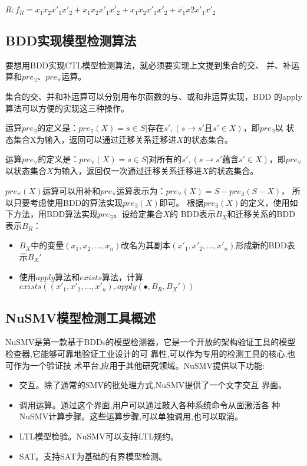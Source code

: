 $R:f_R=\overline{x_1x_2x'_1x'_2}+\overline{x_1x_2}x'_1\bar{x'_2}+x_1\overline{x_2x'_1}x'_2+\bar{x_1}x2\overline{x'_1x'_2}$
\subsection{BDD实现模型检测算法}

要想用BDD实现CTL模型检测算法，就必须要实现上文提到集合的交、
并、补运算和$pre_\exists$、$pre_\forall$运算。

集合的交、并和补运算可以分别用布尔函数的与、或和非运算实现，BDD
的apply算法可以方便的实现这三种操作。

运算$pre_\exists$的定义是：$pre_\exists(X)={s\in S|存在s',(s\to s'且s'\in X)}$，即$pre_\exists$以
状态集合X为输入，返回可以通过迁移关系迁移进$X$的状态集合。

运算$pre_\forall$的定义是：$pre_\forall(X)={s\in S|对所有的s',(s\to s'蕴含s'\in X)}$，即$pre_\forall$
以状态集合$X$为输入，返回仅一次通过迁移关系迁移进$X$的状态集合。

$pre_\forall (X)$运算可以用补和$pre_\forall$运算表示为：$pre_\forall (X)=S - pre_\exists(S-X)$，
所以只要考虑使用BDD的算法实现$pre_\exists(X)$即可。
根据$pre_\exists(X)$的定义，使用如下方法，用BDD算法实现$pre_\exists$。设给定集合$X$的
BDD表示$B_X$和迁移关系的BDD表示$B_R$：
\begin{itemize}

	\item $B_X$中的变量$(x_1,x_2,\ldots,x_n)$改名为其副本$(x'_1,x'_2,\ldots,x'_n)$形成新的BDD表示$B_X'$

	\item 使用$apply$算法和$exists$算法，计算$exists((x'_1,x'_2,\ldots,x'_n),apply(\bullet,B_R,B_X'))$

\end{itemize}


\subsection{NuSMV模型检测工具概述}


NuSMV是第一款基于BDDs的模型检测器，它是一个开放的架构验证工具的模型检查器,它能够可靠地验证工业设计的可
靠性,可以作为专用的检测工具的核心,也可作为一个验证技
术平台,应用于其他研究领域。NuSMV提供以下功能:
\begin{itemize}
\item 交互。除了通常的SMV的批处理方式,NuSMV提供了一个文字交互
界面。

\item 调用运算。通过这个界面,用户可以通过敲入各种系统命令从面激活各
种NuSMV计算步骤。这些运算步骤,可以单独调用,也可以取消。

\item LTL模型检验。NuSMV可以支持LTL规约。

\item SAT。支持SAT为基础的有界模型检测。

\end{itemize}


